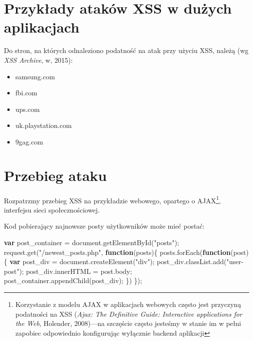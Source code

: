 \documentclass[12pt,polish,a4paper,]{report}
\newenvironment{Shaded}{}{}
\newcommand{\KeywordTok}[1]{\textcolor[rgb]{0.00,0.44,0.13}{\textbf{{#1}}}}
\newcommand{\StringTok}[1]{\textcolor[rgb]{0.25,0.44,0.63}{{#1}}}
\newcommand{\VariableTok}[1]{\textcolor[rgb]{0.10,0.09,0.49}{{#1}}}
\newcommand{\OperatorTok}[1]{\textcolor[rgb]{0.40,0.40,0.40}{{#1}}}
\newcommand{\AttributeTok}[1]{\textcolor[rgb]{0.49,0.56,0.16}{{#1}}}
\newcommand{\NormalTok}[1]{{#1}}
\providecommand{\tightlist}{%
  \setlength{\itemsep}{0pt}\setlength{\parskip}{0pt}}
\begin{document}
\section{Przykłady ataków XSS w dużych
aplikacjach}\label{przykux142ady-atakuxf3w-xss-w-duux17cych-aplikacjach}

Do stron, na których odnaleziono podatność na atak przy użyciu XSS,
należą (wg \emph{XSS Archive}, w, 2015):

\begin{itemize}
\tightlist
\item
  samsung.com
\item
  fbi.com
\item
  ups.com
\item
  uk.playstation.com
\item
  9gag.com
\end{itemize}

\section{Przebieg ataku}\label{przebieg-ataku-2}

Rozpatrzmy przebieg XSS na przykładzie webowego, opartego o
AJAX\footnote{Korzystanie z modelu AJAX w aplikacjach webowych często
  jest przyczyną podatności na XSS (\emph{Ajax: The Definitive Guide:
  Interactive applications for the Web}, Holender, 2008)---na szczęście
  często jesteśmy w stanie im w pełni zapobiec odpowiednio konfigurując
  wyłącznie backend aplikacji}, interfejsu sieci społecznościowej.

Kod pobierający najnowsze posty użytkowników może mieć postać:

\begin{Shaded}
\begin{Highlighting}[]
\KeywordTok{var} \NormalTok{post_container }\OperatorTok{=} \VariableTok{document}\NormalTok{.}\AttributeTok{getElementById}\NormalTok{(}\StringTok{"posts"}\NormalTok{)}\OperatorTok{;}
\VariableTok{request}\NormalTok{.}\AttributeTok{get}\NormalTok{(}\StringTok{"/newest_posts.php"}\OperatorTok{,} \KeywordTok{function}\NormalTok{(posts)}\OperatorTok{\{}
    \VariableTok{posts}\NormalTok{.}\AttributeTok{forEach}\NormalTok{(}\KeywordTok{function}\NormalTok{(post)}\OperatorTok{\{}
        \KeywordTok{var} \NormalTok{post_div }\OperatorTok{=} \VariableTok{document}\NormalTok{.}\AttributeTok{createElement}\NormalTok{(}\StringTok{"div"}\NormalTok{)}\OperatorTok{;}
        \VariableTok{post_div}\NormalTok{.}\VariableTok{classList}\NormalTok{.}\AttributeTok{add}\NormalTok{(}\StringTok{"user-post"}\NormalTok{)}\OperatorTok{;}
        \VariableTok{post_div}\NormalTok{.}\AttributeTok{innerHTML} \OperatorTok{=} \VariableTok{post}\NormalTok{.}\AttributeTok{body}\OperatorTok{;}
        \VariableTok{post_container}\NormalTok{.}\AttributeTok{appendChild}\NormalTok{(post_div)}\OperatorTok{;}
    \OperatorTok{\}}\NormalTok{)}
\OperatorTok{\}}\NormalTok{)}\OperatorTok{;}
\end{Highlighting}
\end{Shaded}
\end{document}
